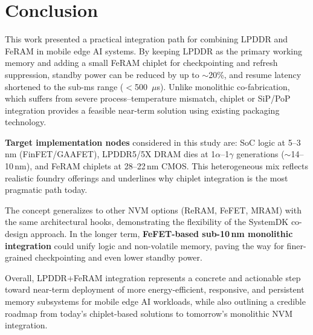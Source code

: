 \section{Conclusion}

This work presented a practical integration path for combining LPDDR and FeRAM in mobile edge AI systems. 
By keeping LPDDR as the primary working memory and adding a small FeRAM chiplet for checkpointing and refresh suppression, 
standby power can be reduced by up to $\sim$20\%, and resume latency shortened to the sub-ms range ($<$500~$\mu$s). 
Unlike monolithic co-fabrication, which suffers from severe process--temperature mismatch, 
chiplet or SiP/PoP integration provides a feasible near-term solution using existing packaging technology.

\textbf{Target implementation nodes} considered in this study are: SoC logic at 5--3\,nm (FinFET/GAAFET), 
LPDDR5/5X DRAM dies at 1$\alpha$--1$\gamma$ generations ($\sim$14--10\,nm), 
and FeRAM chiplets at 28--22\,nm CMOS. 
This heterogeneous mix reflects realistic foundry offerings and underlines why chiplet integration is the most pragmatic path today.

The concept generalizes to other NVM options (ReRAM, FeFET, MRAM) with the same architectural hooks, 
demonstrating the flexibility of the SystemDK co-design approach. 
In the longer term, \textbf{FeFET-based sub-10\,nm monolithic integration} could unify logic and non-volatile memory, 
paving the way for finer-grained checkpointing and even lower standby power. 

Overall, LPDDR+FeRAM integration represents a concrete and actionable step 
toward near-term deployment of more energy-efficient, responsive, and persistent memory subsystems for mobile edge AI workloads,
while also outlining a credible roadmap from today’s chiplet-based solutions to tomorrow’s monolithic NVM integration.
